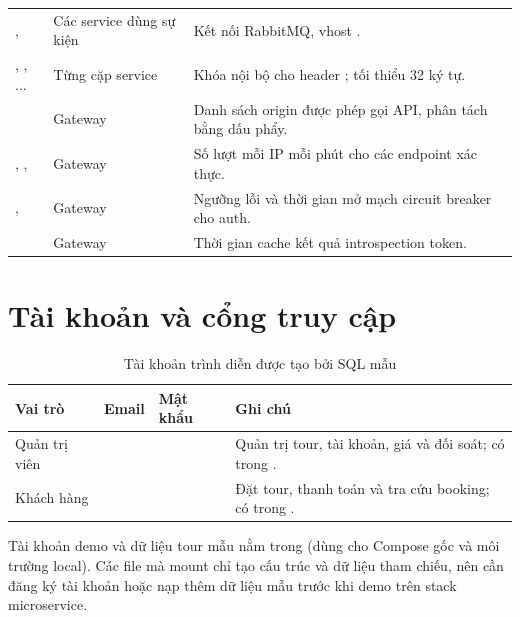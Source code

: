 \begin{longtable}{@{}L{5.4cm}L{3.2cm}L{6.25cm}@{}}
,  & Các service dùng sự kiện & Kết nối RabbitMQ, vhost .\\
, , ... & Từng cặp service & Khóa nội bộ cho header ; tối thiểu 32 ký tự.\\
 & Gateway & Danh sách origin được phép gọi API, phân tách bằng dấu phẩy.\\
, ,  & Gateway & Số lượt mỗi IP mỗi phút cho các endpoint xác thực.\\
,  & Gateway & Ngưỡng lỗi và thời gian mở mạch circuit breaker cho auth.\\
 & Gateway & Thời gian cache kết quả introspection token.\\
\end{longtable}
\endgroup

\section{Tài khoản và cổng truy cập}
\label{sec:tai-khoan-demo}

\begin{table}[H]
\centering
\caption{Tài khoản trình diễn được tạo bởi SQL mẫu}
\label{tab:tai-khoan}
\small
\begin{tabularx}{\textwidth}{@{}L{3.2cm}L{5.0cm}L{3.0cm}Y@{}}
\toprule
\textbf{Vai trò} & \textbf{Email} & \textbf{Mật khẩu} & \textbf{Ghi chú}\\
\midrule
Quản trị viên &  &  & Quản trị tour, tài khoản, giá và đối soát; có trong .\\
Khách hàng &  &  & Đặt tour, thanh toán và tra cứu booking; có trong .\\
\bottomrule
\end{tabularx}
\end{table}

\begin{sloppypar}
\noindent Tài khoản demo và dữ liệu tour mẫu nằm trong  (dùng cho Compose gốc và môi trường local). Các file  mà  mount chỉ tạo cấu trúc và dữ liệu tham chiếu, nên cần đăng ký tài khoản hoặc nạp thêm dữ liệu mẫu trước khi demo trên stack microservice.
\end{sloppypar}

